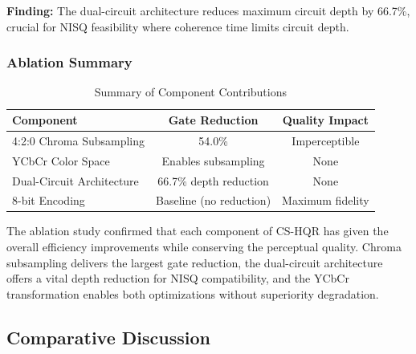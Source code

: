\documentclass[11pt,a4paper]{article}
\begin{document}
\textbf{Finding:} The dual-circuit architecture reduces maximum circuit depth by 66.7\%, crucial for NISQ feasibility where coherence time limits circuit depth.

\subsubsection{Ablation Summary}

\begin{table}[H]
\centering
\caption{Summary of Component Contributions}
\label{tab:ablation_summary}
\begin{tabular}{@{}lcc@{}}
\toprule
\textbf{Component} & \textbf{Gate Reduction} & \textbf{Quality Impact} \\
\midrule
4:2:0 Chroma Subsampling & 54.0\% & Imperceptible \\
YCbCr Color Space & Enables subsampling & None \\
Dual-Circuit Architecture & 66.7\% depth reduction & None \\
8-bit Encoding & Baseline (no reduction) & Maximum fidelity \\
\bottomrule
\end{tabular}
\end{table}

The ablation study confirmed that each component of CS-HQR has given the overall efficiency improvements while conserving the perceptual quality. Chroma subsampling delivers the largest gate reduction, the dual-circuit architecture offers a vital depth reduction for NISQ compatibility, and the YCbCr transformation enables both optimizations without superiority degradation.

\subsection{Comparative Discussion}
\end{document}
